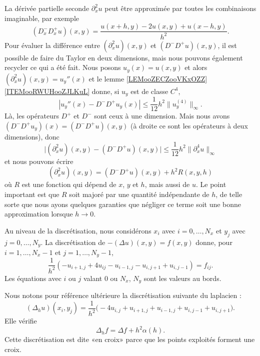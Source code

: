 La dérivée partielle seconde \( \partial^2_xu\) peut être approximée par toutes les combinaisons imaginable, par exemple
\begin{equation}
    (D^-_xD^+_xu)(x,y)=\frac{ u(x+h,y)-2u(x,y)+u(x-h,y) }{ h^2 }.
\end{equation}
Pour évaluer la différence entre \( (\partial^2_xu)(x,y)\) et \( (D^-D^+u)(x,y)\), il est possible de faire du Taylor en deux dimensions, mais nous pouvons également recycler ce qui a été fait. Nous posons \( u_y(x)=u(x,y)\) et alors \( (\partial_x^2u)(x,y)=u_y''(x)\) et le lemme \ref{LEMooZECZooVKxOZZ}\ref{ITEMooRWUHooZJLKuL} donne, si \( u_y\) est de classe \( C^4\),
\begin{equation}
    | u_y''(x)-D^-D^+u_y(x) |\leq \frac{1}{ 12 }h^2\| u_y^{(4)} \|_{\infty}.
\end{equation}
Là, les opérateurs \( D^+\) et \( D^-\) sont ceux à une dimension. Mais nous avons \( (D^-D^+u_y)(x)=(D^-D^+u)(x,y)\) (à droite ce sont les opérateurs à deux dimensions), donc
\begin{equation}
    \big| (\partial^2_xu)(x,y)-(D^-D^+u)(x,y) \big|\leq \frac{1}{ 12 }h^2\| \partial^4_xu \|_{\infty}
\end{equation}
et nous pouvons écrire
\begin{equation}        \label{EQooCLSCooYLYJkU}
    (\partial^2_xu)(x,y)=(D^-D^+u)(x,y)+h^2R(x,y,h)
\end{equation}
où \( R\) est une fonction qui dépend de \( x\), \( y\) et \( h\), mais aussi de \( u\). Le point important est que \( R\) soit majoré par une quantité indépendante de \( h\), de telle sorte que nous ayons quelques garanties que négliger ce terme soit une bonne approximation lorsque \( h\to 0\).

Au niveau de la discrétisation, nous considérons \( x_i\) avec \( i=0,\ldots, N_x\) et \( y_j\) avec \( j=0,\ldots, N_y\). La discrétisation de \( -(\Delta u)(x,y)=f(x,y)\) donne, pour \( i=1,\ldots, N_x-1\) et \( j=1,\ldots, N_y-1\),
\begin{equation}        \label{EQooPWXBooPimUrU}
    \frac{1}{ h^2 }(-u_{i+1,j}+4u_{ij}-u_{i-1,j}-u_{i,j+1}+u_{i,j-1})=f_{ij}.
\end{equation}
Les équations avec \( i\) ou \( j\) valant \( 0\) ou \( N_x\), \( N_y\) sont les valeurs au bords.

\begin{normaltext}
    Nous notons pour référence ultérieure la discrétisation suivante du laplacien :
    \begin{equation}    \label{EQooQQUHooNYVqta}
        (\Delta_hu)(x_i,y_j)=\frac{1}{ h^2 }\big( -4u_{i,j}+u_{i+1,j}+u_{i-1,j}+u_{i,j-1}+u_{i,j+1} \big).
    \end{equation}
    Elle vérifie
    \begin{equation}
        \Delta_hf=\Delta f+h^2\alpha(h).
    \end{equation}
    Cette discrétisation est dite «en croix» parce que les points exploités forment une croix.
\end{normaltext}

